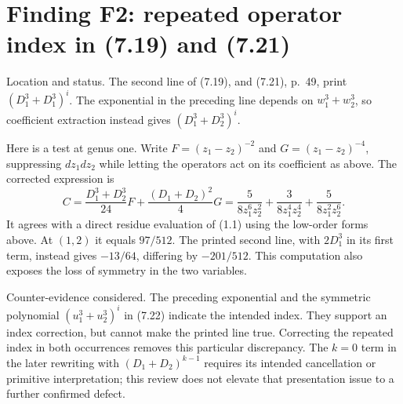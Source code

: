 \documentclass[10pt]{article}
\begin{document}
\section*{Finding F2: repeated operator index in (7.19) and (7.21)}
Location and status. The second line of (7.19), and (7.21), p. 49, print \((D_1^3+D_1^3)^i\). The exponential in the preceding line depends on \(w_1^3+w_2^3\), so coefficient extraction instead gives \((D_1^3+D_2^3)^i\).\par
Here is a test at genus one. Write \(F=(z_1-z_2)^{-2}\) and \(G=(z_1-z_2)^{-4}\), suppressing \(dz_1dz_2\) while letting the operators act on its coefficient as above. The corrected expression is \[C=\frac{D_1^3+D_2^3}{24}F+\frac{(D_1+D_2)^2}{4}G
 =\frac{5}{8z_1^6z_2^2}+
   \frac{3}{8z_1^4z_2^4}+\frac{5}{8z_1^2z_2^6}.\] It agrees with a direct residue evaluation of (1.1) using the low-order forms above. At \((1,2)\) it equals \(97/512\). The printed second line, with \(2D_1^3\) in its first term, instead gives \(-13/64\), differing by \(-201/512\). This computation also exposes the loss of symmetry in the two variables.\par
Counter-evidence considered. The preceding exponential and the symmetric polynomial \((u_1^3+u_2^3)^i\) in (7.22) indicate the intended index. They support an index correction, but cannot make the printed line true. Correcting the repeated index in both occurrences removes this particular discrepancy. The \(k=0\) term in the later rewriting with \((D_1+D_2)^{k-1}\) requires its intended cancellation or primitive interpretation; this review does not elevate that presentation issue to a further confirmed defect.\par
\end{document}
